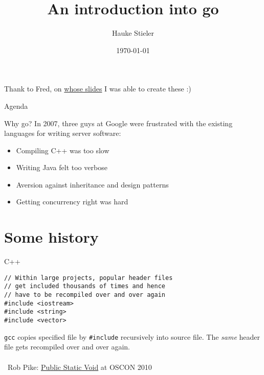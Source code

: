 \documentclass[10pt]{beamer}
\author{Hauke Stieler}
\title{An introduction into go}
\date{\footnotesize \today}
\institute{Universität Hamburg, Department of Informatics}
\begin{document}
	\maketitle
	
	
	\begin{frame}{}
		\begin{center}
			Thank to Fred, on \href{https://github.com/frectures/go}{whose slides} I was able to create these :)
		\end{center}
	\end{frame}
	
	
	\begin{frame}{Agenda}
		\tableofcontents
	\end{frame}


	\begin{frame}{Why go?}
		In 2007, three guys at Google were frustrated with the existing languages for writing server software:
		\begin{itemize}
			\item Compiling C++ was too slow
			\item Writing Java felt too verbose
			\item Aversion against inheritance and design patterns
			\item Getting concurrency right was hard
		\end{itemize}
	\end{frame}

	
	\section{Some history}
	

	\begin{frame}[t,fragile]{C++}
		\begin{verbatim}
// Within large projects, popular header files
// get included thousands of times and hence
// have to be recompiled over and over again
#include <iostream>
#include <string>
#include <vector>
		\end{verbatim}
		\pause
		\texttt{gcc} copies specified file by \texttt{#include} recursively into source file. The \textit{same} header file gets recompiled over and over again.\\
		\\
		\textrightarrow ~Rob Pike: \href{https://www.youtube.com/watch?v=5kj5ApnhPAE}{Public Static Void} at OSCON 2010
\end{frame}
\end{document}
